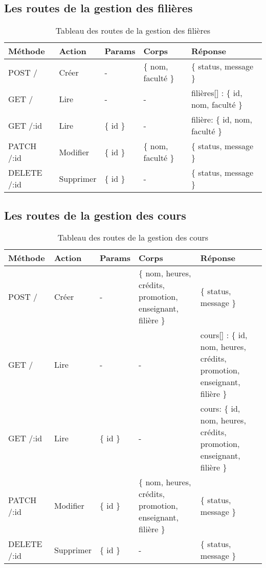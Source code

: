 \subsection{Les routes de la gestion des filières}\label{subsec:routes-field}

\begin{table}[ht]
  \caption{Tableau des routes de la gestion des filières}
  \label{tab:routes-field}
  \begin{tabular}{|p{1.5cm}|p{1.5cm}|p{1.5cm}|p{2.5cm}|p{3cm}|}
    \hline
      Méthode & Action & Params & Corps & Réponse \\
    \hline
        POST / & Créer &  - & \{ nom, faculté \} & \{ status, message \} \\
    \hline
        GET / & Lire & - & - & filières[] : \{ id, nom, faculté \}  \\
    \hline
        GET /:id & Lire & \{ id \} & - & filière: \{ id, nom, faculté \} \\
    \hline
        PATCH /:id & Modifier & \{ id \} & \{ nom, faculté \} & \{ status, message \} \\
    \hline
        DELETE /:id & Supprimer & \{ id \} & - & \{ status, message \} \\
    \hline
  \end{tabular}
\end{table}
\pagebreak

\subsection{Les routes de la gestion des cours}\label{subsec:routes-course}

\begin{table}[ht]
  \caption{Tableau des routes de la gestion des cours}
  \label{tab:routes-course}
  \begin{tabular}{|p{1.5cm}|p{1.5cm}|p{1.5cm}|p{2.5cm}|p{3.5cm}|}
    \hline
      Méthode & Action & Params & Corps & Réponse \\
    \hline
      POST / & Créer &  - &  \{ nom, heures, crédits, promotion, enseignant, filière \} & \{ status, message \} \\
    \hline
        GET /  & Lire & - & - & cours[] :  \{ id, nom, heures, crédits, promotion, enseignant, filière \} \\
    \hline
        GET /:id & Lire & \{ id \} & - & cours: \{ id, nom, heures, crédits, promotion, enseignant, filière \} \\
    \hline
        PATCH /:id & Modifier  & \{ id \} &  \{ nom, heures, crédits, promotion, enseignant, filière \} & \{ status, message \} \\
    \hline
        DELETE /:id & Supprimer & \{ id \} & - & \{ status, message \} \\
    \hline
  \end{tabular}
\end{table}
\pagebreak

